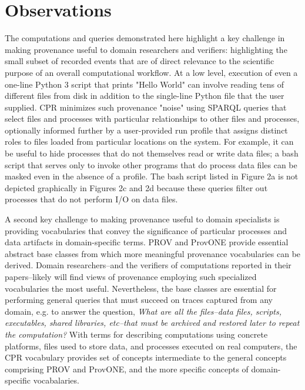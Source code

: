 \section{Observations}

The computations and queries demonstrated here highlight a key challenge in making provenance useful to domain researchers and verifiers: highlighting the small subset of recorded events that are of direct relevance to the scientific purpose of an overall computational workflow. At a low level, execution of even a one-line Python 3 script that prints "Hello World" can involve reading tens of different files from disk in addition to the single-line Python file that the user supplied. CPR minimizes such provenance "noise" using SPARQL queries that select files and processes with particular relationships to other files and processes, optionally informed further by a user-provided run profile that assigns distinct roles to files loaded from particular locations on the system.  For example, it can be useful to hide processes that do not themselves read or write data files; a bash script that serves only to invoke other programs that do process data files can be masked even in the absence of a profile. The bash script listed in Figure 2a is not depicted graphically in Figures 2c and 2d because these queries filter out processes that do not perform I/O on data files.

A second key challenge to making provenance useful to domain specialists is providing vocabularies that convey the significance of particular processes and data artifacts in domain-specific terms. PROV and ProvONE provide essential abstract base classes from which more meaningful provenance vocabularies can be derived.  Domain researchers--and the verifiers of computations reported in their papers--likely will find views of provenance employing such specialized vocabularies the most useful. Nevertheless, the base classes are essential for performing general queries that must succeed on traces captured from any domain, e.g. to answer the question, \emph{What are all the files--data files, scripts, executables, shared libraries, etc--that must be archived and restored later to repeat the computation?} With terms for describing computations using concrete platforms, files used to store data, and processes executed on real computers, the CPR vocabulary provides set of concepts intermediate to the general concepts comprising PROV and ProvONE, and the more specific concepts of domain-specific vocabalaries. 

